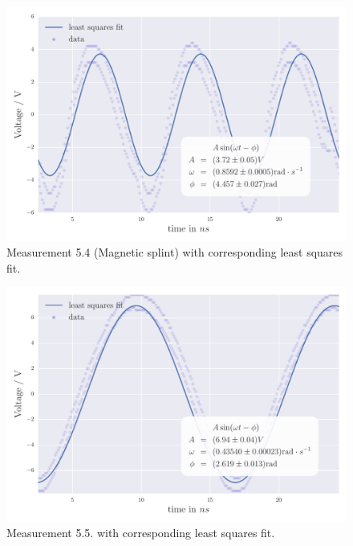 \begin{figure}[H]
    \centering
    \includegraphics[width=0.7\linewidth]{analysis/figures/fit5_4}
    \caption{Measurement 5.4 (Magnetic splint) with corresponding least squares fit.}
    \label{fig:5_4_plot}
\end{figure}
\begin{figure}[H]
    \centering
    \includegraphics[width=0.7\linewidth]{analysis/figures/fit5_5}
    \caption{Measurement 5.5. with corresponding least squares fit.}
    \label{fig:5_5_plot}
\end{figure}

